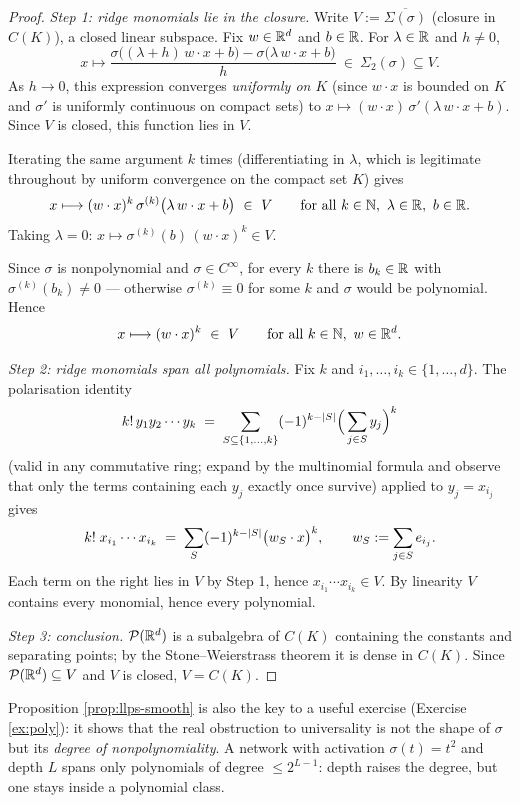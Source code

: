 \documentclass[11pt,a4paper]{article}
\begin{document}
\begin{proof}
\emph{Step 1: ridge monomials lie in the closure.}
Write $V := \overline{\Sigma(\sigma)}$ (closure in $C(K)$), a closed linear subspace. Fix
$w \in \mathbb{R}^d$ and $b \in \mathbb{R}$. For $\lambda \in \mathbb{R}$ and $h \ne 0$,
\[
x \longmapsto \frac{\sigma\big((\lambda + h)\, w\cdot x + b\big) - \sigma\big(\lambda\, w \cdot x + b\big)}{h}
\ \in\ \Sigma_2(\sigma) \subseteq V .
\]
As $h \to 0$, this expression converges \emph{uniformly on $K$} (since $w\cdot x$ is bounded on $K$
and $\sigma'$ is uniformly continuous on compact sets) to
$x \mapsto (w\cdot x)\, \sigma'(\lambda\, w\cdot x + b)$. Since $V$ is closed, this function lies in
$V$.

Iterating the same argument $k$ times (differentiating in $\lambda$, which is legitimate throughout
by uniform convergence on the compact set $K$) gives
\[
x \longmapsto (w\cdot x)^k\, \sigma^{(k)}\big(\lambda\, w\cdot x + b\big) \ \in\ V
\qquad \text{for all } k \in \mathbb{N},\ \lambda \in \mathbb{R},\ b \in \mathbb{R} .
\]
Taking $\lambda = 0$: $x \mapsto \sigma^{(k)}(b)\, (w\cdot x)^k \in V$.

Since $\sigma$ is nonpolynomial and $\sigma \in C^\infty$, for every $k$ there is $b_k \in \mathbb{R}$ with
$\sigma^{(k)}(b_k) \ne 0$ --- otherwise $\sigma^{(k)} \equiv 0$ for some $k$ and $\sigma$ would be
polynomial. Hence
\[
x \longmapsto (w\cdot x)^k \ \in\ V \qquad \text{for all } k \in \mathbb{N},\ w \in \mathbb{R}^d .
\]

\smallskip
\noindent\emph{Step 2: ridge monomials span all polynomials.}
Fix $k$ and $i_1,\dots,i_k \in \{1,\dots,d\}$. The polarisation identity
\[
k!\, y_1 y_2 \cdots y_k \;=\; \sum_{S \subseteq \{1,\dots,k\}} (-1)^{k - \left\lvert S \right\rvert}
\Big( \sum_{j \in S} y_j \Big)^{k}
\]
(valid in any commutative ring; expand by the multinomial formula and observe that only the terms
containing each $y_j$ exactly once survive) applied to $y_j = x_{i_j}$ gives
\[
k!\; x_{i_1}\cdots x_{i_k} \;=\; \sum_{S} (-1)^{k-\left\lvert S \right\rvert} \big( w_S \cdot x \big)^k,
\qquad w_S := \sum_{j \in S} e_{i_j}.
\]
Each term on the right lies in $V$ by Step 1, hence $x_{i_1}\cdots x_{i_k} \in V$. By linearity $V$
contains every monomial, hence every polynomial.

\smallskip
\noindent\emph{Step 3: conclusion.}
$\mathcal{P}(\mathbb{R}^d)$ is a subalgebra of $C(K)$ containing the constants and separating points; by the
Stone--Weierstrass theorem it is dense in $C(K)$. Since $\mathcal{P}(\mathbb{R}^d) \subseteq V$ and $V$ is closed,
$V = C(K)$.
\end{proof}

\begin{remark}
Proposition \ref{prop:llps-smooth} is also the key to a useful exercise (Exercise \ref{ex:poly}):
it shows that the real obstruction to universality is not the shape of $\sigma$ but its
\emph{degree of nonpolynomiality}. A network with activation $\sigma(t) = t^2$ and depth $L$ spans
only polynomials of degree $\le 2^{L-1}$: depth raises the degree, but one stays inside a
polynomial class.
\end{remark}
\end{document}
